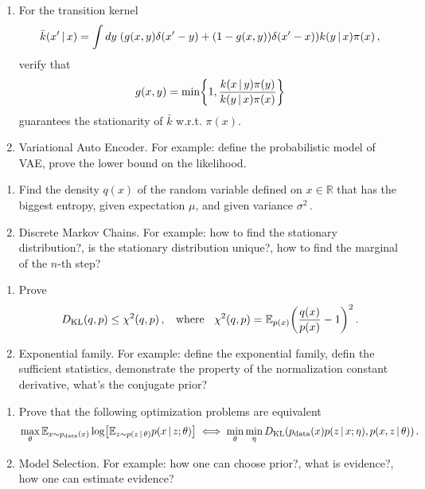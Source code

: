 \documentclass{article}
\begin{document}
\begin{question}
\begin{enumerate}
    \item For the transition kernel
    \begin{align*}
        \bar{k}(x'\,|\, x) = \int dy\; (g(x,y)\delta(x'-y) + (1-g(x,y))\delta(x'-x))k(y\,|\, x)\pi(x)\,,
    \end{align*}
    verify that 
    \begin{align*}
        g(x,y) = \min\left\{1,\frac{k(x\cond y)\pi(y)}{k(y\cond x)\pi(x)}\right\}
    \end{align*} 
    guarantees the stationarity of $\bar{k}$ w.r.t. $\pi(x)$.
    \item Variational Auto Encoder. For example: define the probabilistic model of VAE, prove the lower bound on the likelihood.
\end{enumerate}
\end{question}

\begin{question}
\begin{enumerate}
    \item Find the density $q(x)$ of the random variable defined on $x \in \mathbb{R}$ that has the biggest entropy, given expectation $\mu$, and given variance $\sigma^2$\,.
    \item Discrete Markov Chains. For example: how to find the stationary distribution?, is the stationary distribution unique?, how to find the marginal of the $n$-th step?
\end{enumerate}
\end{question}

\begin{question}
\begin{enumerate}
    \item Prove
    \begin{align*}
        \KL(q,p) \leq \chi^2(q,p)\,,\;\; \text{ where }\;\;\chi^2(q,p) = \mean_{p(x)} \left(\frac{q(x)}{p(x)}-1\right)^2\,.
    \end{align*}
    \item Exponential family. For example: define the exponential family, defin the sufficient statistics, demonstrate the property of the normalization constant derivative, what's the conjugate prior?
\end{enumerate}
\end{question}

\begin{question}
\begin{enumerate}
    \item Prove that the following optimization problems are equivalent
    \begin{align*}
        \max_\theta \mean_{x\sim p_{\text{data}}(x)}\log \left[\mean_{z \sim p(z\cond\theta)}p(x\cond z;\theta)\right] \iff \min_\theta \min_\eta\KL(p_{\text{data}}(x)p(z\cond x;\eta), p(x,z\cond \theta))\,.
    \end{align*}
    \item Model Selection. For example: how one can choose prior?, what is evidence?, how one can estimate evidence?
\end{enumerate}
\end{question}
\end{document}
